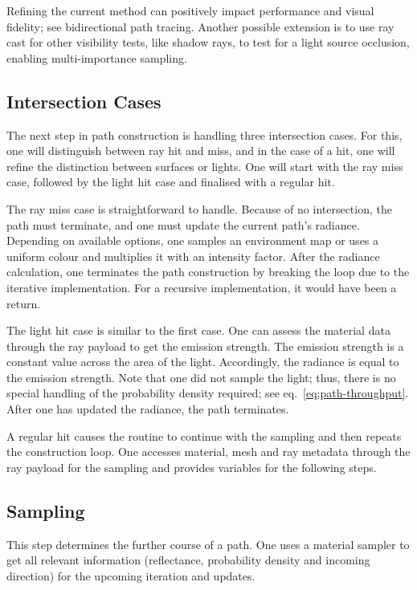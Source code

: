 Refining the current method can positively impact performance and visual fidelity; see bidirectional path tracing.
Another possible extension is to use ray cast for other visibility tests, like shadow rays, to test for a light source occlusion, enabling multi-importance sampling.

\subsection*{Intersection Cases}

The next step in path construction is handling three intersection cases.
For this, one will distinguish between ray hit and miss, and in the case of a hit, one will refine the distinction between surfaces or lights.
One will start with the ray miss case, followed by the light hit case and finalised with a regular hit.

The ray miss case is straightforward to handle.
Because of no intersection, the path must terminate, and one must update the current path's radiance.
Depending on available options, one samples an environment map or uses a uniform colour and multiplies it with an intensity factor.
After the radiance calculation, one terminates the path construction by breaking the loop due to the iterative implementation.
For a recursive implementation, it would have been a return.

The light hit case is similar to the first case.
One can assess the material data through the ray payload to get the emission strength.
The emission strength is a constant value across the area of the light.
Accordingly, the radiance is equal to the emission strength.
Note that one did not sample the light; thus, there is no special handling of the probability density required; see eq.~\ref{eq:path-throughput}.
After one has updated the radiance, the path terminates.

A regular hit causes the routine to continue with the sampling and then repeats the construction loop.
One accesses material, mesh and ray metadata through the ray payload for the sampling and provides variables for the following steps.

\subsection*{Sampling}

This step determines the further course of a path.
One uses a material sampler to get all relevant information (reflectance, probability density and incoming direction) for the upcoming iteration and updates.

